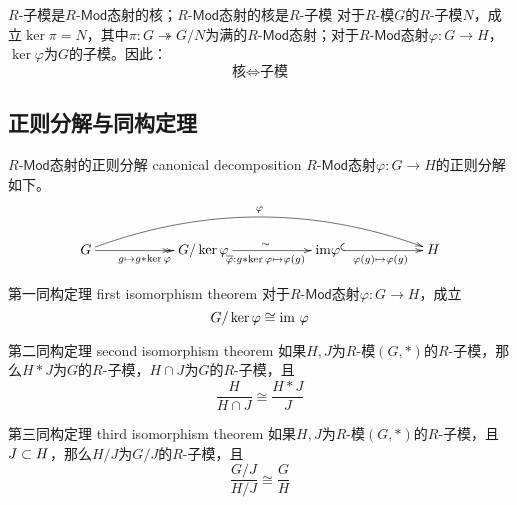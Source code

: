 \begin{theorem}{$R$-子模是$R$-$\mathsf{Mod}$态射的核；$R$-$\mathsf{Mod}$态射的核是$R$-子模}
	对于$R$-模$G$的$R$-子模$N$，成立$\ker\pi=N$，其中$\pi:G\twoheadrightarrow G/N$为满的$R$-$\mathsf{Mod}$态射；对于$R$-$\mathsf{Mod}$态射$\varphi:G\to H$，$\ker\varphi$为$G$的子模。因此：
	$$
	\text{核}\iff\text{子模}
	$$
\end{theorem}

\subsection{正则分解与同构定理}

\begin{definition}{$R$-$\mathsf{Mod}$态射的正则分解 canonical decomposition}
	$R$-$\mathsf{Mod}$态射$\varphi:G\to H$的正则分解如下。
	$$
	\xymatrix@=13ex{
		G \ar@/^2pc/[rrr]^{\varphi} \ar@{->>}[r]_{g\mapsto g*\ker\varphi} & G/\ker\varphi \ar@{->}[r]_{\overline{\varphi}:g*\ker\varphi\mapsto \varphi(g)}^{\sim} & \mathrm{im}\varphi \ar@{^{(}->}[r]_{\varphi(g)\mapsto \varphi(g)} & H
	}
	$$
\end{definition}

\begin{definition}{第一同构定理 first isomorphism theorem}
	对于$R$-$\mathsf{Mod}$态射$\varphi:G\to H$，成立
	$$
	G/\ker\varphi \cong \text{im } \varphi
	$$
\end{definition}

\begin{definition}{第二同构定理 second isomorphism theorem}
	如果$H,J$为$R$-模$(G,*)$的$R$-子模，那么$H*J$为$G$的$R$-子模，$H\cap J$为$G$的$R$-子模，且
	$$
	\frac{H}{H\cap J}\cong\frac{H*J}{J}
	$$
\end{definition}

\begin{definition}{第三同构定理 third isomorphism theorem}
	如果$H,J$为$R$-模$(G,*)$的$R$-子模，且$J\subset H$，那么$H/J$为$G/J$的$R$-子模，且
	$$
	\frac{G/J}{H/J}\cong\frac{G}{H}
	$$
\end{definition}

% 
